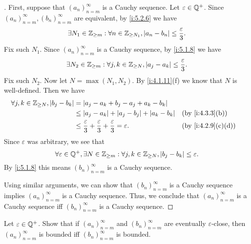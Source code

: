 \begin{proof}[]
  First, suppose that \((a_n)_{n = m}^\infty\) is a Cauchy sequence.
  Let \(\varepsilon \in \mathbb{Q}^+\).
  Since \((a_n)_{n = m}^\infty, (b_n)_{n = m}^\infty\) are equivalent, by \cref{i:5.2.6} we have
  \[
    \exists N_1 \in \mathbb{Z}_{\geq m} : \forall n \in \mathbb{Z}_{\geq N_1}, \left\lvert a_n - b_n\right\rvert \leq \dfrac{\varepsilon}{3}.
  \]
  Fix such \(N_1\).
  Since \((a_n)_{n = m}^\infty\) is a Cauchy sequence, by \cref{i:5.1.8} we have
  \[
    \exists N_2 \in \mathbb{Z}_{\geq m} : \forall j, k \in \mathbb{Z}_{\geq N}, \left\lvert a_j - a_k\right\rvert \leq \dfrac{\varepsilon}{3}.
  \]
  Fix such \(N_2\).
  Now let \(N = \max(N_1, N_2)\).
  By \cref{i:4.1.11}(f) we know that \(N\) is well-defined.
  Then we have
  \begin{align*}
    \forall j, k \in \Z_{\geq N}, \abs{b_j - b_k} & = \abs{a_j - a_k + b_j - a_j + a_k - b_k}                                                                           \\
                                                  & \leq \abs{a_j - a_k} + \abs{a_j - b_j} + \abs{a_k - b_k}                                     &  & \by{i:4.3.3}[b]   \\
                                                  & \leq \dfrac{\varepsilon}{3} + \dfrac{\varepsilon}{3} + \dfrac{\varepsilon}{3} = \varepsilon. &  & \by{i:4.2.9}[c,d]
  \end{align*}
  Since \(\varepsilon\) was arbitrary, we see that
  \[
    \forall \varepsilon \in \mathbb{Q}^+, \exists N \in \mathbb{Z}_{\geq m} : \forall j, k \in \mathbb{Z}_{\geq N}, \left\lvert b_j - b_k\right\rvert \leq \varepsilon.
  \]
  By \cref{i:5.1.8} this means \((b_n)_{n = m}^\infty\) is a Cauchy sequence.

  Using similar arguments, we can show that \((b_n)_{n = m}^\infty\) is a Cauchy sequence implies \((a_n)_{n = m}^\infty\) is a Cauchy sequence.
  Thus, we conclude that \((a_n)_{n = m}^\infty\) is a Cauchy sequence iff \((b_n)_{n = m}^\infty\) is a Cauchy sequence.
\end{proof}

\begin{ex}\label{i:ex:5.2.2}
  Let \(\varepsilon \in \mathbb{Q}^+\).
  Show that if \((a_n)_{n = m}^{\infty}\) and \((b_n)_{n = m}^{\infty}\) are eventually \(\varepsilon\)-close, then \((a_n)_{n = m}^{\infty}\) is bounded iff \((b_n)_{n = m}^{\infty}\) is bounded.
\end{ex}


